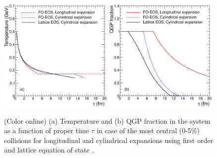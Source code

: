 \documentclass[aps,prc,preprint,superscriptaddress,showpacs,showkeys]{revtex4-1}
\begin{document}
\begin{figure}
\includegraphics[width=0.49\textwidth]{Figures/Fig1a_TauVsTemp.eps}
\includegraphics[width=0.49\textwidth]{Figures/Fig1b_TauVsFQGP.eps}
\caption{(Color online) (a) Temperature and (b) QGP fraction in the system as a function of proper 
time $\tau$ in case of the most central (0-5$\%$) collisions for longitudinal and cylindrical expansions 
using first order and lattice equation of state . }
\label{fig:TauVsTemp}
\end{figure}





\end{document}
